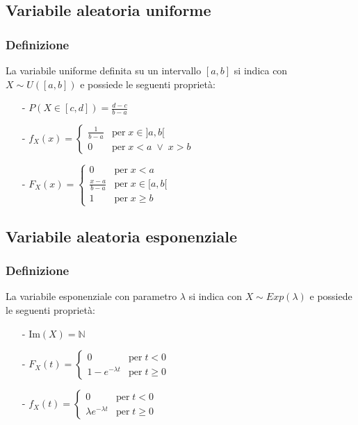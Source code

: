 \documentclass[a4paper]{article}
\begin{document}
\subsection{Variabile aleatoria uniforme}
\subsubsection*{Definizione}
La variabile uniforme definita su un intervallo \([a,b]\) si indica con \(X \sim U([a,b])\) e possiede le seguenti proprietà:
\begin{itemize}[topsep=3pt, itemsep=0pt]
	\item[-] \(\displaystyle P(X \in [c,d]) = \frac{d-c}{b-a}\)
	\item[-] \(\displaystyle f_X(x) = \begin{cases} \displaystyle \frac{1}{b-a} &\text{per} \; x \in ]a,b[ \\ 0 &\text{per} \; x < a \; \vee \; x > b \end{cases}\)
	\item[-] \(\displaystyle F_X(x) = \begin{cases} 0 &\text{per} \; x < a \\ \displaystyle \frac{x-a}{b-a} &\text{per} \; x \in [a,b[ \\ 1 &\text{per} \; x \geq b \end{cases}\)
\end{itemize}

\subsection{Variabile aleatoria esponenziale}
\subsubsection*{Definizione}
La variabile esponenziale con parametro \(\lambda\) si indica con \(X \sim Exp(\lambda)\) e possiede le seguenti proprietà:
\begin{itemize}[topsep=3pt, itemsep=0pt]
	\item[-] \(\text{Im}(X) = \mathbb{N}\)
	\item[-] \(F_X(t) = \begin{cases} 0 &\text{per} \; t < 0 \\ 1 - e^{-\lambda t} &\text{per} \; t \geq 0 \end{cases}\)
	\item[-] \(f_X(t) = \begin{cases} 0 &\text{per} \; t < 0 \\ \lambda e^{-\lambda t} &\text{per} \; t \geq 0 \end{cases}\)
\end{itemize}
\end{document}
